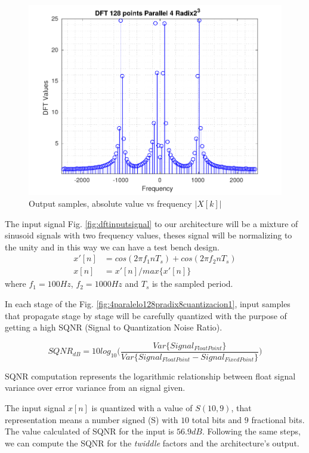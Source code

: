 \documentclass[journal,comsoc]{IEEEtran}
\begin{document}
\begin{figure} 
	\centering
	\includegraphics[width=0.95\linewidth]{Diagramas/DftFixedPoint.pdf}
	\caption{Output samples, absolute value vs frequency $|X[k]|$}
	\label{fig:dftfixedpoint}
\end{figure}
The input signal Fig. \ref{fig:dftinputsignal} to our architecture will be a mixture of sinusoid signals with two frequency values, theses signal will be normalizing to the unity and in this way we can have a test bench design.
\begin{align}\label{eq: inputSignal}
x'[n] &= cos(2\pi f_1 n T_s) + cos(2\pi f_2 n T_s)  \\
x[n] &= x'[n]/max\{x'[n]\} 						\nonumber
\end{align}
where $f_1=100Hz$, $f_2=1000Hz$ and $T_s$ is the sampled period.

In each stage of the Fig. \ref{fig:4paralelo128pradix8cuantizacion1}, input samples that propagate stage by stage will be carefully quantized with the purpose of getting a high SQNR (Signal to Quantization Noise Ratio).
\begin{small}
\begin{equation*}%
SQNR_{dB} = 10log_{10} \bigg(  \frac{  Var\{Signal_{FloatPoint}\}  }{  Var\{Signal_{FloatPoint} - Signal_{FixedPoint}\}}  \bigg)
\end{equation*}
\end{small}
SQNR computation represents the logarithmic relationship between float signal variance over error variance from an signal given.

The input signal $x[n]$ is quantized with a value of $S(10,9)$, that representation means a number signed (S) with $10$ total bits and $9$ fractional bits. The value calculated of SQNR for the input is $56.9dB$. Following the same steps, we can compute the SQNR for the \textit{twiddle} factors and the architecture's output.
\end{document}
